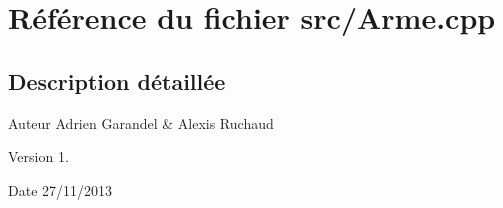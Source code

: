 \section{Référence du fichier src/\-Arme.cpp}
\label{_arme_8cpp}


\subsection{Description détaillée}
\begin{DoxyAuthor}{Auteur}
Adrien Garandel \& Alexis Ruchaud 
\end{DoxyAuthor}
\begin{DoxyVersion}{Version}
1. 
\end{DoxyVersion}
\begin{DoxyDate}{Date}
27/11/2013 
\end{DoxyDate}
